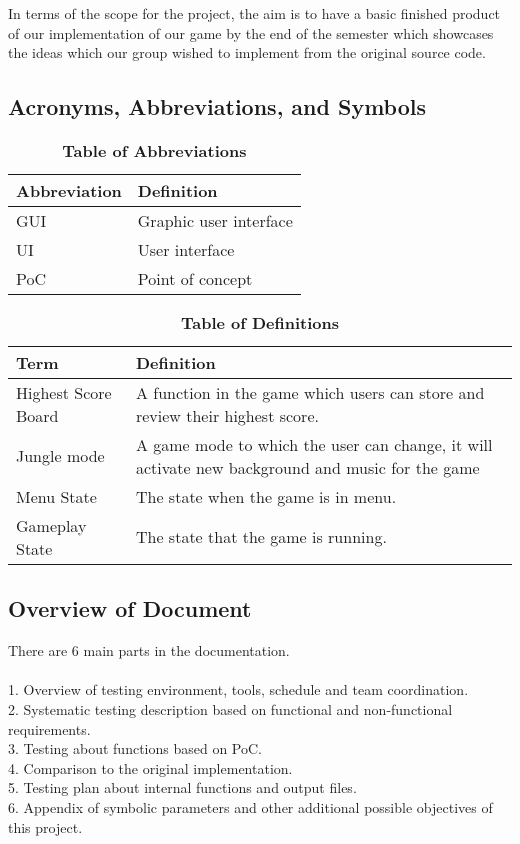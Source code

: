 \documentclass[12pt, titlepage]{article}
\newcommand{\rev}[1]{\textcolor{RevisionColour}{#1}}
\begin{document}
\rev{In terms of the scope for the project, the aim is to have a basic finished product of our implementation of our game by the end of the semester which showcases the ideas which our group wished to implement from the original source code.}

\subsection{Acronyms, Abbreviations, and Symbols}

\begin{table}[hbp]
\caption{\textbf{Table of Abbreviations}} \label{Table}

\begin{tabularx}{\textwidth}{p{3cm}X}
\toprule
\textbf{Abbreviation} & \textbf{Definition} \\
\midrule
GUI & Graphic user interface\\
UI & User interface\\
PoC & Point of concept\\

\bottomrule
\end{tabularx}

\end{table}

\begin{table}[!htbp]
\caption{\textbf{Table of Definitions}} \label{Table}

\begin{tabularx}{\textwidth}{p{3cm}X}
\toprule
\textbf{Term} & \textbf{Definition}\\
\midrule
Highest Score Board & A function in the game which users can store and review their highest score.\\
Jungle mode & A game mode to which the user can change, it will activate new background and music for the game\\
Menu State & The state when the game is in menu.\\
Gameplay State & The state that the game is running.\\
\bottomrule
\end{tabularx}

\end{table}	

\subsection{Overview of Document}
 There are 6 main parts in the documentation.\\\\
  1. Overview of testing environment, tools, schedule and team coordination.\\
  2. Systematic testing description based on functional and non-functional requirements.\\
  3. Testing about functions based on PoC.\\
  4. Comparison to the original implementation.\\
  5. Testing plan about internal functions and output files.\\
  6. Appendix of symbolic parameters and other additional possible objectives of this project.\\
\end{document}
